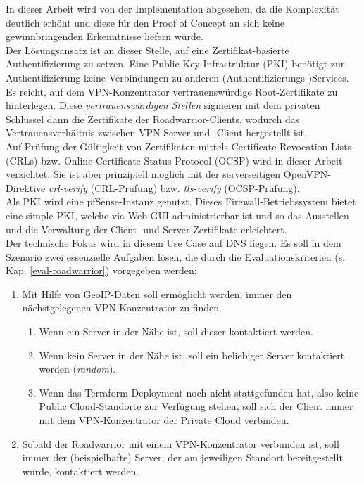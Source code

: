 In dieser Arbeit wird von der Implementation abgesehen, da die Komplexität deutlich erhöht und diese für den Proof of Concept an sich keine gewinnbringenden Erkenntnisse liefern würde.\\
Der Lösungsansatz ist an dieser Stelle, auf eine Zertifikat-basierte Authentifizierung zu setzen. Eine Public-Key-Infrastruktur (PKI) benötigt zur Authentifizierung keine Verbindungen zu anderen (Authentifizierungs-)Services. Es reicht, auf dem \gls{VPN-Konzentrator} vertrauenswürdige Root-Zertifikate zu hinterlegen. Diese \textit{vertrauenswürdigen Stellen} signieren mit dem privaten Schlüssel dann die Zertifikate der \gls{Roadwarrior}-\gls{Client}s, wodurch das Vertrauensverhältnis zwischen VPN-Server und -\gls{Client} hergestellt ist.\\ 
Auf Prüfung der Gültigkeit von Zertifikaten mittels Certificate Revocation Lists (CRLs) bzw. Online Certificate Status Protocol (OCSP) wird in dieser Arbeit verzichtet. Sie ist aber prinzipiell möglich mit der serverseitigen OpenVPN-Direktive \textit{crl-verify} (CRL-Prüfung) bzw. \textit{tls-verify} (OCSP-Prüfung).\cite[S.116, S.325-327]{Keijser2011}\\
Als \gls{PKI} wird eine pfSense-Instanz genutzt. Dieses Firewall-Betriebssystem bietet eine simple \gls{PKI}, welche via Web-GUI administrierbar ist und so das Ausstellen und die Verwaltung der \gls{Client}- und Server-Zertifikate erleichtert.\cite[S.376-383]{Netgate2020}\\
Der technische Fokus wird in diesem Use Case auf \gls{DNS} liegen. Es soll in dem Szenario zwei essenzielle Aufgaben lösen, die durch die Evaluationskriterien (s. Kap. \ref{eval-roadwarrior}) vorgegeben werden:\label{evalkriterien-uc2}
\begin{enumerate}
\item Mit Hilfe von \gls{GeoIP}-Daten soll ermöglicht werden, immer den nächstgelegenen \gls{VPN-Konzentrator} zu finden.\label{geoip-nearest-vpn}
\begin{enumerate}[label=(\alph*)]
    \item Wenn ein Server in der Nähe ist, soll dieser kontaktiert werden.\label{server-nearest}
    \item Wenn kein Server in der Nähe ist, soll ein beliebiger Server kontaktiert werden (\textit{random})\cite{bindrrset2020}.\label{no-server}
    \item Wenn das Terraform \gls{Deployment} noch nicht stattgefunden hat, also keine Public Cloud-Standorte zur Verfügung stehen, soll sich der \gls{Client} immer mit dem \gls{VPN-Konzentrator} der Private Cloud verbinden.\label{server-not-deployed}
\end{enumerate}
\item Sobald der \gls{Roadwarrior} mit einem \gls{VPN-Konzentrator} verbunden ist, soll immer der (beispielhafte) Server, der am jeweiligen Standort bereitgestellt wurde, kontaktiert werden.
\end{enumerate}

